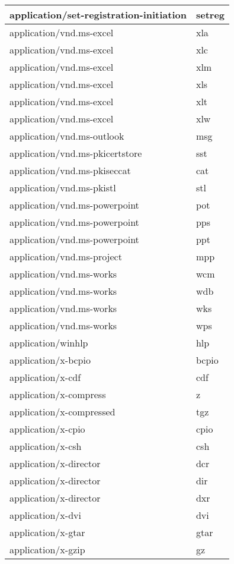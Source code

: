 \begin{longtable}{|p{200pt}|p{40pt}|}
\hline
application/set-registration-initiation	&setreg\\
\hline
application/vnd.ms-excel				&xla\\
\hline
application/vnd.ms-excel				&xlc\\
\hline
application/vnd.ms-excel				&xlm\\
\hline
application/vnd.ms-excel				&xls	\\
\hline
application/vnd.ms-excel				&xlt\\
\hline
application/vnd.ms-excel				&xlw\\
\hline
application/vnd.ms-outlook				&msg\\
\hline
application/vnd.ms-pkicertstore			&sst\\
\hline
application/vnd.ms-pkiseccat			&cat\\
\hline
application/vnd.ms-pkistl				&stl\\
\hline
application/vnd.ms-powerpoint			&pot\\
\hline
application/vnd.ms-powerpoint			&pps\\
\hline
application/vnd.ms-powerpoint			&ppt\\
\hline
application/vnd.ms-project				&mpp\\
\hline
application/vnd.ms-works				&wcm\\
\hline
application/vnd.ms-works				&wdb\\
\hline
application/vnd.ms-works				&wks\\
\hline
application/vnd.ms-works				&wps\\
\hline
application/winhlp						&hlp\\
\hline
application/x-bcpio						&bcpio\\
\hline
application/x-cdf						&cdf\\
\hline
application/x-compress					&z\\
\hline
application/x-compressed				&tgz\\
\hline
application/x-cpio						&cpio\\
\hline
application/x-csh						&csh\\
\hline
application/x-director					&dcr\\
\hline
application/x-director					&dir\\
\hline
application/x-director					& dxr\\
\hline
application/x-dvi						&dvi\\
\hline
application/x-gtar						&gtar\\
\hline
application/x-gzip						&gz\\

\end{longtable}
